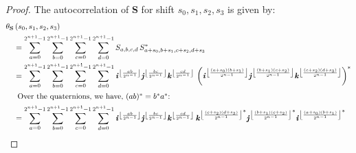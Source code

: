 \documentclass[12pt]{article}
\theoremstyle{definition}
\begin{document}
\begin{proof}
The autocorrelation of \textbf{S} for shift $s_0, s_1, s_2, s_3$ is given by: 
\begin{align}
\theta_{\textbf{S}}&\left(s_0,s_1,s_2,s_3 \right)\nonumber\\ 
    &=\sum_{a=0}^{2^{n+1}-1}\sum_{b=0}^{2^{n+1}-1}\sum_{c=0}^{2^{n+1}-1}\sum_{d=0}^{2^{n+1}-1}
    S_{a,b,c,d}\,S_{a+s_0,b+s_1,c+s_2,d+s_3}^*\nonumber\\
&= \sum_{a=0}^{2^{n+1}-1}\sum_{b=0}^{2^{n+1}-1}\sum_{c=0}^{2^{n+1}-1}\sum_{d=0}^{2^{n+1}-1}
    \ii^{\left\lfloor\frac{a b}{2^{n-1}}\right\rfloor} \jj^{\left\lfloor\frac{b c}{2^{n-1}}\right\rfloor} 
    \kk^{\left\lfloor\frac{c d}{2^{n-1}}\right\rfloor} \,
    \left(\ii^{\left\lfloor\frac{(a+s_0) (b+s_1)}{2^{n-1}}\right\rfloor} 
    \jj^{\left\lfloor\frac{(b+s_1) (c+s_2)}{2^{n-1}}\right\rfloor} 
    \kk^{\left\lfloor\frac{(c+s_2) (d+s_3)}{2^{n-1}}\right\rfloor}\right)^*\nonumber\\
\intertext{\indent Over the quaternions, we have, $(a b)^* = b^* a^*$:}
&= \sum_{a=0}^{2^{n+1}-1}\sum_{b=0}^{2^{n+1}-1}\sum_{c=0}^{2^{n+1}-1}\sum_{d=0}^{2^{n+1}-1}
    \ii^{\left\lfloor\frac{a b}{2^{n-1}}\right\rfloor} 
    \jj^{\left\lfloor\frac{b c}{2^{n-1}}\right\rfloor}
    \kk^{\left\lfloor\frac{c d}{2^{n-1}}\right\rfloor} \,
    {\kk^{\left\lfloor\frac{(c+s_2) (d+s_3)}{2^{n-1}}\right\rfloor}}^*    
    {\jj^{\left\lfloor\frac{(b+s_1) (c+s_2)}{2^{n-1}}\right\rfloor}}^*
    {\ii^{\left\lfloor\frac{(a+s_0) (b+s_1)}{2^{n-1}}\right\rfloor}}^*\label{quatproof0}
\end{align}


\end{proof}
\end{document}
